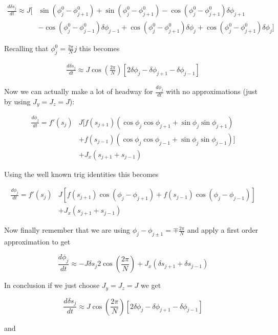 \documentclass{article}
\begin{document}
\begin{align*}
    \frac{d\delta s_j}{dt} \approx J[&\sin(\phi_j^0 - \phi_{j+1}^0) + \sin(\phi_j^0 - \phi_{j+1}^0) - \cos(\phi_j^0 - \phi_{j+1}^0)\delta\phi_{j+1} \\ 
                                     & - \cos(\phi_j^0 - \phi_{j-1}^0)\delta\phi_{j-1} + \cos(\phi_j^0 - \phi_{j+1}^0)\delta\phi_{j} + \cos(\phi_j^0 - \phi_{j+1}^0)\delta\phi_{j}]
\end{align*}

Recalling that $\phi_j^0 = \frac{2\pi}{N}j$ this becomes

\begin{align*}
    \frac{d\delta s_j}{dt} \approx J\cos( \frac{2\pi}{N})[2\delta\phi_j - \delta\phi_{j + 1} - \delta\phi_{j - 1}]
\end{align*}

Now we can actually make a lot of headway for $\frac{d \phi_j}{dt}$ with no approximations (just by using $J_y = J_z = J$):

\begin{align*}
    \frac{d \phi_j}{dt} = f'(s_j)&J[f(s_{j+1})(\cos\phi_j \cos\phi_{j+1} + \sin\phi_j\sin\phi_{j+1}) \\
                                 & + f(s_{j-1})(\cos\phi_j \cos\phi_{j-1} + \sin\phi_j\sin\phi_{j-1})] \\
                                 & + J_x (s_{j+1} + s_{j-1})
\end{align*}

Using the well known trig identities this becomes

\begin{align*}
    \frac{d \phi_j}{dt} = f'(s_j)&J[f(s_{j+1})\cos(\phi_j - \phi_{j+1}) + f(s_{j-1})\cos(\phi_j - \phi_{j-1})] \\
                                 & + J_x (s_{j+1} + s_{j-1})
\end{align*}

Now finally remember that we are using $\phi_j - \phi_{j\pm1} = \mp \frac{2\pi}{N}$ and apply a first order approximation to get

\[
    \frac{d \phi_j}{dt} \approx -J\delta s_j2\cos(\frac{2\pi}{N}) + J_x(\delta s_{j+1} + \delta s_{j-1})
\]

In conclusion if we just choose $J_y = J_z = J$ we get

\[
    \boxed{\frac{d\delta s_j}{dt} \approx J\cos( \frac{2\pi}{N})[2\delta\phi_j - \delta\phi_{j + 1} - \delta\phi_{j - 1}]}
\]

and
\end{document}
